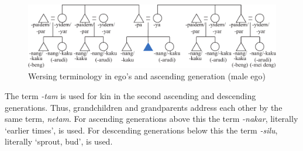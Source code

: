 \begin{figure}[h]
\includegraphics[width=\textwidth]{figures/Holton_ch5_fig14.pdf}
\caption{Wersing terminology in ego's and ascending generation (male ego)}
\label{fig14_wersing}
\end{figure}
 

The term \textit{-tam} is used for kin in the second ascending and descending generations. Thus, grandchildren and grandparents address each other by the same term, \textit{netam}. For ascending generations above this the term \textit{\mbox{-}nakar}, literally `earlier times', is used. For descending generations below this the term \textit{{}-silu}, literally `sprout, bud', is used. 
 

